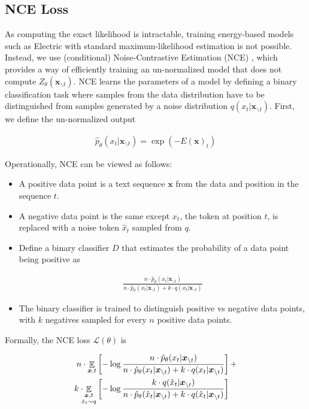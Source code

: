 \documentclass[11pt,a4paper]{article}
\newcommand{\alns}[1] {
	\begin{align*} #1 \end{align*}
}
\newcommand{\Z}{Z_\theta(\cntxt)}
\newcommand{\bx}{\bm{x}}
\newcommand{\cntxt}{\bx_{\backslash t}}
\newcommand{\up}{\hat{p}_\theta}
\newcommand{\E} {\mathop{\mathbb{E}}}
\begin{document}
\subsection{NCE Loss}
As computing the exact likelihood is intractable, training energy-based models such as Electric with standard maximum-likelihood estimation is not possible.
Instead, we use (conditional) Noise-Contrastive Estimation (NCE) \citep{Gutmann2010NoisecontrastiveEA, Ma2018NoiseCE}, which provides a way of efficiently training an un-normalized model that does not compute $\Z$.
NCE learns the parameters of a model by defining a binary classification task where samples from the data distribution have to be distinguished from samples generated by a noise distribution $q(x_t|\bx_{\backslash t})$. First, we define the un-normalized output
\vspace{-1mm}
\alns{
    \up(x_t | \cntxt) = \exp{(-E(\bx)_t)} 
}
\vspace{-1mm}
\noindent Operationally, NCE can be viewed as follows: \vspace{-1.2mm}
\begin{itemize}
    \item A positive data point is a text sequence $\bx$ from the data and position in the sequence $t$. \vspace{-1mm}
    \item A negative data point is the same except $x_t$, the token at position $t$, is replaced with a noise token $\hat{x}_t$ sampled from $q$. \vspace{-1mm}
    \item Define a binary classifier $D$ that estimates the probability of a data point being positive as\vspace{-1mm}
    \alns{\frac{n\cdot\up(x_t | \cntxt)}{n\cdot\up(x_t | \cntxt) + k\cdot q(x_t | \cntxt)}} \vspace{-5mm}
    \item The binary classifier is trained to distinguish positive vs negative data points, with $k$ negatives sampled for every $n$ positive data points. \vspace{-1mm}
\end{itemize}
\vspace{-1.2mm}
Formally, the NCE loss $\mathcal{L}(\theta)$ is
\alns{
n\cdot\E_{\bx, t} &\left[-\log{\frac{n \cdot \up(x_t | \cntxt)}{n \cdot \up(x_t | \cntxt) + k\cdot q(x_t | \cntxt)}} \right] + \\
k\cdot \hspace{-1.5mm} \E_{\substack{\bx, t \\ \hat{x}_t \sim q}} &\left[ -\log{\frac{k\cdot q(\hat{x}_t | \cntxt)}{n \cdot \up(\hat{x}_t | \cntxt) + k\cdot q(\hat{x}_t | \bx_{\backslash t})}} \right]
}
\end{document}
